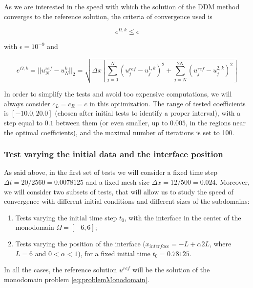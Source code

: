 \indent As we are interested in the speed with which the solution of the DDM method converges to the reference solution, the criteria of convergence used is

\begin{equation*}
\label{eq:criteriaConvergence}
	e^{\Omega,k} \leq \epsilon
\end{equation*}

\noindent with $\epsilon = 10^{-9}$ and 

\begin{equation*}
	e^{\Omega,k} = ||u^{ref}_N - u^{k}_N||_2 = \sqrt{\Delta x \left[ \sum_{j=0}^N{(u^{ref}_j - u^{1,k}_j)^2 } + \sum_{j=N}^{2N}{(u^{ref}_j - u^{2,k}_j)^2 } \right] }
\end{equation*}
 
\indent In order to simplify the tests and avoid too expensive computations, we will always consider $c_L = c_R = c$ in this optimization. The range of tested coefficients is $[-10.0, 20.0]$ (chosen after initial tests to identify a proper interval), with a step equal to  $0.1$ between them (or even smaller, up to $0.005$, in the regions near the optimal coefficients), and the maximal number of iterations is set to 100.

\subsubsection{Test varying the initial data and the interface position}

\indent As said above, in the first set of tests we will consider a fixed time step $\Delta t = 20/2560 = 0.0078125$ and a fixed mesh size $\Delta x = 12/500 = 0.024$. Moreover, we will consider two subsets of tests, that will allow us to study the speed of convergence with different initial conditions and different sizes of the subdomains:

\begin{enumerate}
	\item Tests varying the initial time step $t_0$, with the interface in the center of the monodomain $\Omega = [-6,6]$;
	\item Tests varying the position of the interface ($x_{interface} = -L + \alpha 2L$, where $L = 6$ and $0 < \alpha < 1$), for a fixed initial time $t_0 = 0.78125$.
\end{enumerate}

\indent In all the cases, the reference solution $u^{ref}$ will be the solution of the monodomain problem \eqref{eq:problemMonodomain}.

